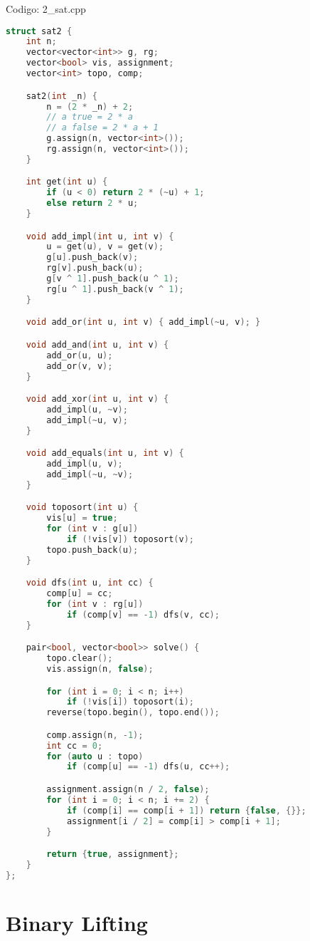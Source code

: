 \documentclass[10pt, a4paper, oneside]{book}
\begin{document}
Codigo: 2\_sat.cpp

\begin{lstlisting}[language=C++]
struct sat2 {
    int n;
    vector<vector<int>> g, rg;
    vector<bool> vis, assignment;
    vector<int> topo, comp;

    sat2(int _n) {
        n = (2 * _n) + 2;
        // a true = 2 * a
        // a false = 2 * a + 1
        g.assign(n, vector<int>());
        rg.assign(n, vector<int>());
    }

    int get(int u) {
        if (u < 0) return 2 * (~u) + 1;
        else return 2 * u;
    }

    void add_impl(int u, int v) {
        u = get(u), v = get(v);
        g[u].push_back(v);
        rg[v].push_back(u);
        g[v ^ 1].push_back(u ^ 1);
        rg[u ^ 1].push_back(v ^ 1);
    }

    void add_or(int u, int v) { add_impl(~u, v); }

    void add_and(int u, int v) {
        add_or(u, u);
        add_or(v, v);
    }

    void add_xor(int u, int v) {
        add_impl(u, ~v);
        add_impl(~u, v);
    }

    void add_equals(int u, int v) {
        add_impl(u, v);
        add_impl(~u, ~v);
    }

    void toposort(int u) {
        vis[u] = true;
        for (int v : g[u])
            if (!vis[v]) toposort(v);
        topo.push_back(u);
    }

    void dfs(int u, int cc) {
        comp[u] = cc;
        for (int v : rg[u])
            if (comp[v] == -1) dfs(v, cc);
    }

    pair<bool, vector<bool>> solve() {
        topo.clear();
        vis.assign(n, false);

        for (int i = 0; i < n; i++)
            if (!vis[i]) toposort(i);
        reverse(topo.begin(), topo.end());

        comp.assign(n, -1);
        int cc = 0;
        for (auto u : topo)
            if (comp[u] == -1) dfs(u, cc++);

        assignment.assign(n / 2, false);
        for (int i = 0; i < n; i += 2) {
            if (comp[i] == comp[i + 1]) return {false, {}};
            assignment[i / 2] = comp[i] > comp[i + 1];
        }

        return {true, assignment};
    }
};\end{lstlisting}
\hfill

\section{Binary Lifting}
\end{document}
